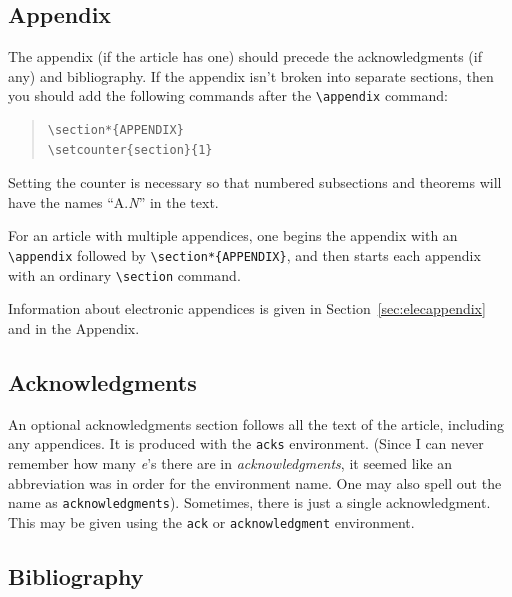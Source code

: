 \documentclass[acmtocl]{acmtrans2m}
\begin{document}
\subsection{Appendix}

The appendix (if the article has one) should precede the
acknowledgments (if any) and bibliography.
If the appendix isn't broken into separate sections,
then you should add the following commands after the \verb|\appendix|
command:
\begin{quote}
\begin{verbatim}
\section*{APPENDIX}
\setcounter{section}{1}
\end{verbatim}
\end{quote}
Setting the counter is necessary so that numbered subsections and
theorems will have the names ``A.{\em N\/}'' in the text.

For an article with multiple appendices, one begins
the appendix with an \verb|\appendix| followed by
\verb|\section*{APPENDIX}|, and then starts each
appendix with an ordinary \verb|\section| command.

Information about electronic appendices is given in
Section~\ref{sec:elecappendix} and in the Appendix.

\subsection{Acknowledgments}

An optional acknowledgments section follows all the text of the
article, including any appendices.  It is produced with the
{\tt acks} environment.  (Since I can never remember how many
{\em e\/}'s there are in {\em acknowledgments}, it seemed
like an abbreviation was in order for the environment name.
One may also spell out the name as {\tt acknowledgments}).
Sometimes, there is just a single acknowledgment.
This may be given using the {\tt ack} or {\tt acknowledgment}
environment.

\subsection{Bibliography}
\end{document}
